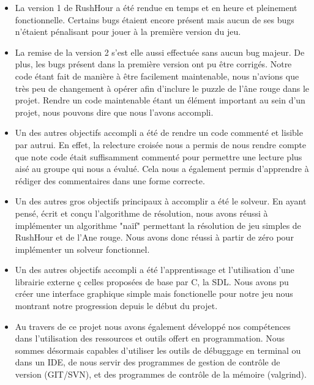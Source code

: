 \documentclass{article}
\begin{document}
\begin{itemize}
\item La version 1 de RushHour a été rendue en temps et en heure et pleinement fonctionnelle. Certains bugs étaient encore présent mais aucun de ses bugs n'étaient pénalisant pour jouer à la première version du jeu.\\

\item La remise de la version 2 s'est elle aussi effectuée sans aucun bug majeur. De plus, les bugs présent dans la première version ont pu être corrigés. Notre code étant fait de manière à être facilement maintenable, nous n'avions que très peu de changement à opérer afin d'inclure le puzzle de l'âne rouge dans le projet. Rendre un code maintenable étant un élément important au sein d'un projet, nous pouvons dire que nous l'avons accompli.\\

\item Un des autres objectifs accompli a été de rendre un code commenté et lisible par autrui. En effet, la relecture croisée nous a permis de nous rendre compte que note code était suffisamment commenté pour permettre une lecture plus aisé au groupe qui nous a évalué. Cela nous a également permis d'apprendre à rédiger des commentaires dans une forme correcte.\\

\item  Un des autres gros objectifs principaux à accomplir a été le solveur. En ayant pensé, écrit et conçu l'algorithme de résolution, nous avons réussi à implémenter un algorithme "naïf" permettant la résolution de jeu simples de RushHour et de l'Ane rouge. Nous avons donc réussi à partir de zéro pour implémenter un solveur fonctionnel.\\

\item Un des autres objectifs accompli a été l'apprentissage et l'utilisation d'une librairie externe ç celles proposées de base par C, la SDL. Nous avons pu créer une interface graphique simple mais fonctionelle pour notre jeu nous montrant notre progression depuis le début du projet.\\

\item Au travers de ce projet nous avons également développé nos compétences dans l'utilisation des ressources et outils offert en programmation. Nous sommes désormais capables d'utiliser les outils de débuggage en terminal ou dans un IDE, de nous servir des programmes de gestion de contrôle de version (GIT/SVN), et des programmes de contrôle de la mémoire (valgrind).\newpage
\end{itemize}
\end{document}
